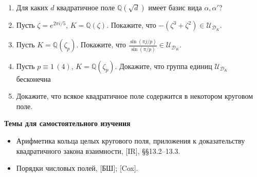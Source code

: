 \begin{enumerate}[topsep=0pt]
    \item Для каких $d$ квадратичное поле $\mathbb{Q}(\sqrt{d})$ имеет базис вида $\alpha, \alpha'$? %
    \item Пусть $\zeta=e^{2\pi i / 5}$, $K=\mathbb{Q}(\zeta)$. Покажите, что $-(\zeta^3+\zeta^2)\in\mathcal{U}_{\mathcal{D}_K}$. %
    \item Пусть $K=\mathbb{Q}(\zeta_p)$. Покажите, что $\frac{\sin(\pi j / p)}{\sin(\pi / p)} \in \mathcal{U}_{\mathcal{D}_K}$. %
    \item Пусть $p\equiv 1\,(4)$, $K=\mathbb{Q}(\zeta_p)$. Докажите, что группа единиц $\mathcal{U}_{\mathcal{D}_K}$ бесконечна %
    \item Докажите, что всякое квадратичное поле содержится в некотором круговом поле. %
\end{enumerate}


\noindent\textbf{Темы для самостоятельного изучения}
\begin{itemize}[topsep=0pt]
    \item Арифметика кольца целых кругового поля, приложения к доказательству квадратичного закона взаимности, [IR], \S\S 13.2--13.3.
    \item Порядки числовых полей, [БШ]; [Cox].
\end{itemize}